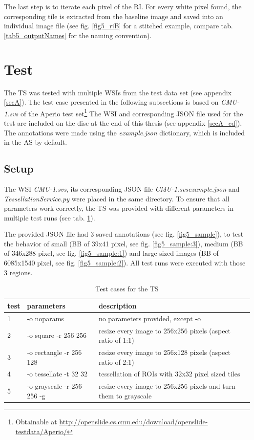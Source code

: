 The last step is to iterate each pixel of the RI. For every white pixel found, the corresponding tile is extracted from the baseline image and saved into an individual image file (see fig. \ref{fig5_riB} for a stitched example, compare tab. \ref{tab5_outputNames} for the naming convention).


\clearpage
\section{Test}
\label{sec5_test}
The TS was tested with multiple WSIs from the test data set (see appendix \ref{secA}). The test case presented in the following subsections is based on \emph{CMU-1.svs} of the Aperio test set\footnote{
	Obtainable at \url{http://openslide.cs.cmu.edu/download/openslide-testdata/Aperio/}
} The WSI and corresponding JSON file used for the test are included on the disc at the end of this thesis (see appendix \ref{secA_cd}). The annotations were made using the \emph{example.json} dictionary, which is included in the AS by default.


\subsection{Setup}
\label{sec5_testSetup}
The WSI \emph{CMU-1.svs}, its corresponding JSON file \emph{CMU-1.svs{\textunderscore}example.json} and \emph{TessellationService.py} were placed in the same directory. To ensure that all parameters work correctly, the TS was provided with different parameters in multiple test runs (see tab. \ref{tab5_tests}).

The provided JSON file had 3 saved annotations (see fig. \ref{fig5_sample}), to test the behavior of small (BB of 39x41 pixel, see fig. \ref{fig5_sample:3}), medium (BB of 346x288 pixel, see fig. \ref{fig5_sample:1}) and large sized images (BB of 6085x1540 pixel, see fig. \ref{fig5_sample:2}). All test runs were executed with those 3 regions.

\begin{table}[H]
	\begin{center}
		\begin{tabular}{| p{1.5cm} | p{3cm} |  p{5.5cm} |}
			\hline
			\textbf{test} & \textbf{parameters} & \textbf{description}\\ \hline
			1 & -o noparams & no parameters provided, except -o \\ \hline
			2 & -o square -r 256 256 & resize every image to 256x256 pixels (aspect ratio of 1:1)\\ \hline
			3 & -o rectangle -r 256 128 & resize every image to 256x128 pixels (aspect ratio of 2:1) \\ \hline
			4 & -o tessellate -t 32 32 & tessellation of ROIs with 32x32 pixel sized tiles \\ \hline
			5 & -o grayscale -r 256 256 -g & resize every image to 256x256 pixels and turn them to grayscale\\ \hline
		\end{tabular}
		\caption{Test cases for the TS}
		\label{tab5_tests}
	\end{center}
\end{table}

